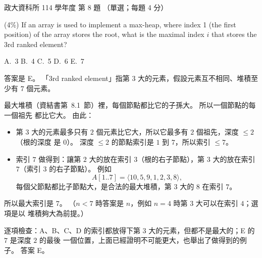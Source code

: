 \begin{pastexam}[label={px:nccu-114-dsa-08}]{政大資科所 114 學年度 第 8 題}
（單選；每題 4 分）

(4\%) If an array is used to implement a max-heap, where index 1 (the first position) of the array
stores the root, what is the maximal index $i$ that stores the 3rd ranked element?

A.~3 \qquad B.~4 \qquad C.~5 \qquad D.~6 \qquad E.~7
\end{pastexam}

\begin{pastsoln}
答案是 E。 「3rd ranked element」指第 $3$ 大的元素，假設元素互不相同、堆積至少有 $7$ 個元素。

最大堆積（資結書第~8.1~節）裡，每個節點都比它的子孫大。 所以一個節點的每一個祖先
都比它大。 由此：
\begin{itemize}
\item 第 $3$ 大的元素最多只有 $2$ 個元素比它大，所以它最多有 $2$ 個祖先，深度 $\le 2$（根的深度
是 $0$）。 深度 $\le 2$ 的節點索引是 $1$ 到 $7$，所以索引 $\le 7$。
\item 索引 $7$ 做得到：讓第 $2$ 大的放在索引 $3$（根的右子節點），第 $3$ 大的放在索引 $7$（索引
$3$ 的右子節點）。 例如
\[
A[1..7] = \langle 10, 5, 9, 1, 2, 3, 8 \rangle ,
\]
每個父節點都比子節點大，是合法的最大堆積，第 $3$ 大的 $8$ 在索引 $7$。
\end{itemize}
所以最大索引是 $7$。 （$n < 7$ 時答案是 $n$，例如 $n = 4$ 時第 $3$ 大可以在索引 $4$；選項是以
堆積夠大為前提。）

逐項檢查：A、B、C、D 的索引都放得下第 $3$ 大的元素，但都不是最大的；E 的 $7$ 是深度 $2$ 的最後
一個位置，上面已經證明不可能更大，也舉出了做得到的例子。 答案 E。
\end{pastsoln}
